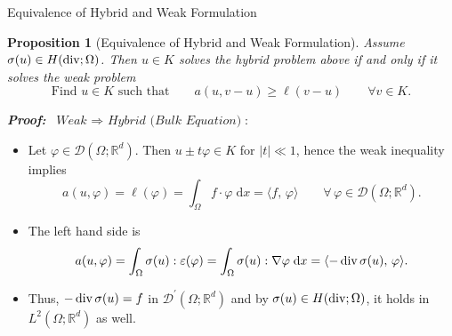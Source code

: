 \documentclass[10pt,aspectratio=169]{beamer}
\newtheorem{proposition}{Proposition}[section]
\def\R{{\mathbb R}}
\def\cD{{\mathcal D}}
\def\d{{\mathrm{d}}}
\def\dx{{\d x}}
\newcommand{\diver}{\operatornamewithlimits{div}}
\begin{document}
\begin{frame}{Equivalence of Hybrid and Weak Formulation}
	\begin{proposition}[Equivalence of Hybrid and Weak Formulation]
		Assume $\sigma(u)\in H(\diver;\Omega)$. Then $u\in K$ solves the hybrid problem above if and only if it solves the weak problem
		\begin{equation*}
			\text{Find }u\in K\text{ such that}\qquad a(u,v-u)\ge\ell(v-u)\qquad \forall v\in K.
		\end{equation*}
	\end{proposition}
	\textbf{\em Proof:} $\ \textit{Weak }\Rightarrow\textit{ Hybrid (Bulk Equation)}$:
	\begin{itemize}
		\item Let $\varphi\in \cD(\Omega;\R^d)$. Then $u\pm t\varphi\in K$ for $|t|\ll 1$, hence the weak inequality implies
		      \begin{equation*}
			      a(u,\varphi)=\ell(\varphi)=\int_\Omega f\cdot \varphi\;\dx = \langle f,\,\varphi\rangle\qquad \forall\,\varphi\in \cD(\Omega;\R^d).
		      \end{equation*}
		\item The left hand side is
		      \begin{equation*}
			      a(u,\varphi) = \int_\Omega\sigma(u):\varepsilon(\varphi) = \int_\Omega\sigma(u):\nabla\varphi\;\dx = \langle -\diver\sigma(u),\,\varphi\rangle.
		      \end{equation*}
		\item Thus, $-\diver\sigma(u) = f$ in $\cD^\prime(\Omega;\R^d)$ and by $\sigma(u)\in H(\diver;\Omega)$, it holds in $L^2(\Omega;\R^d)$ as well.
	\end{itemize}
\end{frame}
\end{document}
